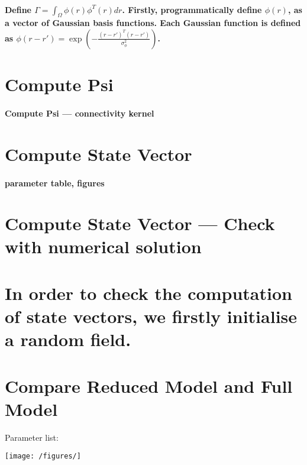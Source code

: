 \documentclass[a4paper, 8pt, english]{article}
\begin{document}
\paragraph{Define $\Gamma=\int_{\Omega}\phi(r)\phi^{T}(r)dr$. Firstly, programmatically
define $\phi(r)$, as a vector of Gaussian basis functions. Each Gaussian
function is defined as $\phi(r-r')=\exp{(-\frac{(r-r')^{T}(r-r')}{\sigma_{\phi}^{2}})}$.}

\section{Compute Psi}
\label{compute psi}
\paragraph{Compute Psi --- connectivity kernel}
\label{par:Compute}

\section{Compute State Vector}
\label{state vector}
\paragraph{parameter table, figures}


\section{Compute State Vector --- Check with numerical solution}
\label{sec:Compute State Vector --- Check}
\section{In order to check the computation of state vectors, we firstly initialise a random field. }



\section{Compare Reduced Model and Full Model}
Parameter list:

\texttt{[image: /figures/]}
\end{document}
